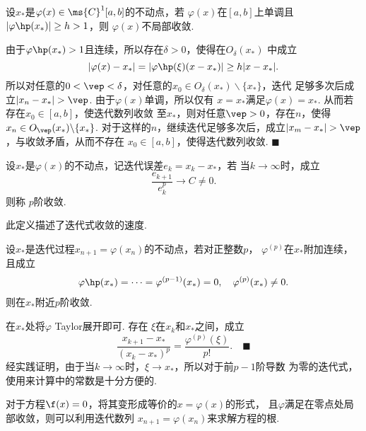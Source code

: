   \begin{pos}[不局部收敛的条件]
    设$x_*$是$\varphi(x)\in\ms{C}^1[a, b]$的不动点，若
    $\varphi(x)$在$[a, b]$上单调且$|\varphi\hp(x_*)|\ge h>1$，则
    $\varphi(x)$不局部收敛.
  \end{pos}
  \proof
    由于$\varphi\hp(x_*)>1$且连续，所以存在$\delta>0$，使得在$O_\delta(x_*)$
    中成立
    \[
      |\varphi(x)-x_*| = |\varphi\hp(\xi)(x-x_*)| \ge h|x-x_*|.
    \]
    所以对任意的$0<\vep<\delta$，对任意的$x_0\in O_\delta(x_*)
    \backslash\{x_*\}$，迭代
    足够多次后成立$|x_n-x_*|>\vep$. 由于$\varphi(x)$单调，所以仅有
    $x=x_*$满足$\varphi(x)=x_*$. 从而若存在$x_0\in[a, b]$，使迭代数列收敛
    至$x_*$，则对任意$\vep>0$，存在$n$，使得$x_n\in O_{\vep}(x_*)\backslash\{x_*\}$.
    对于这样的$n$，继续迭代足够多次后，成立$|x_m-x_*|>\vep$，与收敛矛盾，从而不存在
    $x_0\in[a, b]$，使得迭代数列收敛. $\blacksquare$

  \begin{defi}[$p$阶收敛]
    \label{defi: p阶收敛}
    设$x_*$是$\varphi(x)$的不动点，记迭代误差$e_k=x_k-x_*$，若
    当$k\to\infty$时，成立
    \[
      \frac{e_{k+1}}{e_k^p} \to C \ne 0.
    \]
    则称 $p$阶收敛.
  \end{defi}
  \remark
    此定义描述了迭代式收敛的速度.

  \begin{thm}[$p$阶收敛条件]
    \label{thm: p阶收敛条件}
    设$x_*$是迭代过程$x_{n+1}=\varphi(x_n)$的不动点，若对正整数$p$，
    $\varphi^{(p)}$在$x_*$附加连续，且成立
    \[\begin{split}
      \varphi\hp(x_*) = \cdots = \varphi^{(p-1)}(x_*) = 0,\quad
      \varphi^{(p)}(x_*) \ne 0.
    \end{split}\]
    则在$x_*$附近$p$阶收敛.
  \end{thm}
  \proof
    在$x_*$处将$\varphi$ Taylor展开即可. 存在
    $\xi$在$x_k$和$x_*$之间，成立
    \begin{equation}
      \label{equ: 导数为零情况余项}
      \frac{x_{k+1}-x_*}{(x_k-x_*)^p} = \frac{\varphi^{(p)}(\xi)}{p!}.
      \quad\blacksquare
    \end{equation}
  \remark
    经实践证明，由于当$k\to\infty$时，$\xi\to x_*$，所以对于前$p-1$阶导数
    为零的迭代式，使用来计算中的常数是十分方便的.


  \begin{alg}[不动点法]
    对于方程$\f(x) = 0$，将其变形成等价的$x=\varphi(x)$的形式，
    且$\varphi$满足在零点处局部收敛，则可以利用迭代数列
    $x_{n+1} = \varphi(x_n)$来求解方程的根.
  \end{alg}

